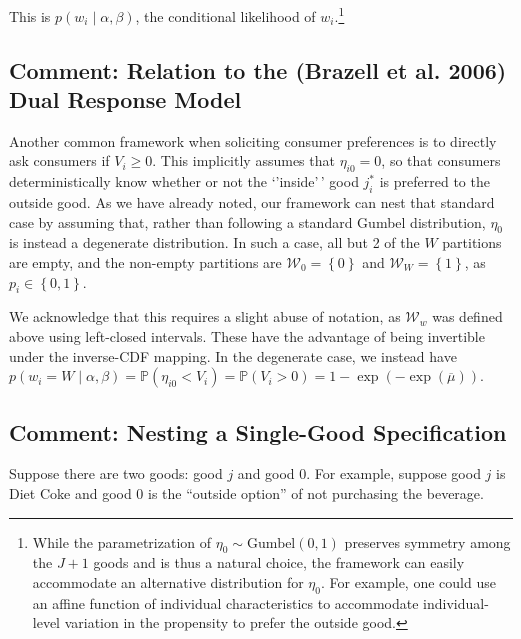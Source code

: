 \documentclass[
]{article}
\begin{document}
This is \(p\left(w_i\mid \alpha, \beta\right)\), the conditional
likelihood of \(w_i\).\footnote{While the parametrization of
  \(\eta_0 \sim \text{Gumbel}\left(0,1\right)\) preserves symmetry among
  the \(J+1\) goods and is thus a natural choice, the framework can
  easily accommodate an alternative distribution for \(\eta_0\). For
  example, one could use an affine function of individual
  characteristics to accommodate individual-level variation in the
  propensity to prefer the outside good.}

\subsection{Comment: Relation to the (Brazell et al. 2006) Dual Response
Model}\label{comment-relation-to-the-brazell_2006-dual-response-model}

Another common framework when soliciting consumer preferences is to
directly ask consumers if \(V_i \ge 0\). This implicitly assumes that
\(\eta_{i0} = 0\), so that consumers deterministically know whether or
not the `'inside'\,' good \(j^*_i\) is preferred to the outside good. As
we have already noted, our framework can nest that standard case by
assuming that, rather than following a standard Gumbel distribution,
\(\eta_0\) is instead a degenerate distribution. In such a case, all but
2 of the \(W\) partitions are empty, and the non-empty partitions are
\(\mathcal{W}_0 = \left\lbrace 0 \right\rbrace\) and
\(\mathcal{W}_W = \left\lbrace 1\right\rbrace\), as
\(p_i \in \left\lbrace 0, 1\right\rbrace\).

We acknowledge that this requires a slight abuse of notation, as
\(\mathcal{W}_w\) was defined above using left-closed intervals. These
have the advantage of being invertible under the inverse-CDF mapping. In
the degenerate case, we instead have
\(p\left(w_i = W\mid\alpha,\beta\right) = \mathbb{P}\left(\eta_{i0} < V_i\right) = \mathbb{P}\left(V_i > 0\right) = 1 - \exp\left(-\exp\left(\overline{\mu}\right)\right)\).

\subsection{Comment: Nesting a Single-Good
Specification}\label{comment-nesting-a-single-good-specification}

Suppose there are two goods: good \(j\) and good \(0\). For example,
suppose good \(j\) is Diet Coke and good 0 is the ``outside option'' of
not purchasing the beverage.
\end{document}
